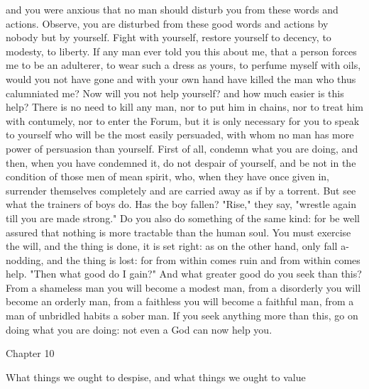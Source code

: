 \documentclass[a4paper]{article}
\begin{document}
and you were anxious that no man should disturb you from these words and
actions.
    Observe, you are disturbed from these good words and actions by nobody but
by yourself. Fight with yourself, restore yourself to decency, to modesty, to
liberty. If any man ever told you this about me, that a person forces me to be
an adulterer, to wear such a dress as yours, to perfume myself with oils, would
you not have gone and with your own hand have killed the man who thus
calumniated me? Now will you not help yourself? and how much easier is this
help? There is no need to kill any man, nor to put him in chains, nor to treat
him with contumely, nor to enter the Forum, but it is only necessary for you to
speak to yourself who will be the most easily persuaded, with whom no man has
more power of persuasion than yourself. First of all, condemn what you are
doing, and then, when you have condemned it, do not despair of yourself, and be
not in the condition of those men of mean spirit, who, when they have once
given in, surrender themselves completely and are carried away as if by a
torrent. But see what the trainers of boys do. Has the boy fallen? "Rise," they
say, "wrestle again till you are made strong." Do you also do something of the
same kind: for be well assured that nothing is more tractable than the human
soul. You must exercise the will, and the thing is done, it is set right: as on
the other hand, only fall a-nodding, and the thing is lost: for from within
comes ruin and from within comes help. "Then what good do I gain?" And what
greater good do you seek than this? From a shameless man you will become a
modest man, from a disorderly you will become an orderly man, from a faithless
you will become a faithful man, from a man of unbridled habits a sober man. If
you seek anything more than this, go on doing what you are doing: not even a
God can now help you.

Chapter 10

What things we ought to despise, and what things we ought to value
\end{document}
